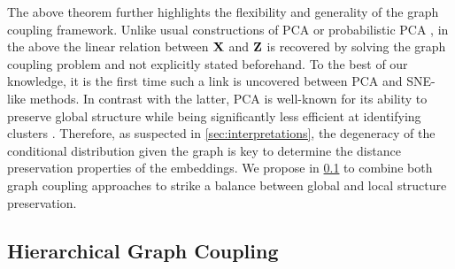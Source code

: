The above theorem further highlights the flexibility and generality of the graph coupling framework. Unlike usual constructions of PCA or probabilistic PCA \cite{tipping1999probabilistic}, in the above the linear relation between $\mathbf{X}$ and $\mathbf{Z}$ is recovered by solving the graph coupling problem and not explicitly stated beforehand. To the best of our knowledge, it is the first time such a link is uncovered between PCA and SNE-like methods. In contrast with the latter, PCA is well-known for its ability to preserve global structure while being significantly less efficient at identifying clusters \cite{anowar2021conceptual}. Therefore, as suspected in \cref{sec:interpretations}, the degeneracy of the conditional distribution given the graph is key to determine the distance preservation properties of the embeddings. We propose in \cref{sec:hierarchical_modelling} to combine both graph coupling approaches to strike a balance between global and local structure preservation.


\subsection{Hierarchical Graph Coupling}\label{sec:hierarchical_modelling}

